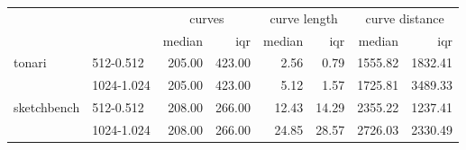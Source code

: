 \begin{tabular}{llrrrrrr}
\toprule
 &  & \multicolumn{2}{c}{curves} & \multicolumn{2}{c}{curve length} & \multicolumn{2}{c}{curve distance} \\
 &  & median & \acrshort{iqr} & median & \acrshort{iqr} & median & \acrshort{iqr} \\
\midrule
\multirow[t]{2}{*}{tonari} & 512-0.512 & 205.00 & 423.00 & 2.56 & 0.79 & 1555.82 & 1832.41 \\
 & 1024-1.024 & 205.00 & 423.00 & 5.12 & 1.57 & 1725.81 & 3489.33 \\
\cline{1-8}
\multirow[t]{2}{*}{sketchbench} & 512-0.512 & 208.00 & 266.00 & 12.43 & 14.29 & 2355.22 & 1237.41 \\
 & 1024-1.024 & 208.00 & 266.00 & 24.85 & 28.57 & 2726.03 & 2330.49 \\
\cline{1-8}
\bottomrule
\end{tabular}
